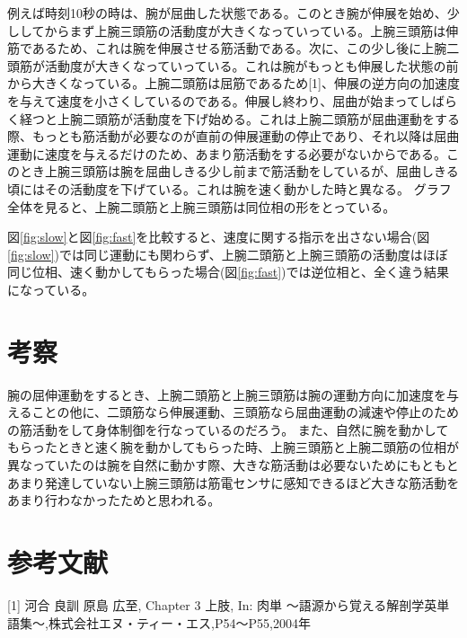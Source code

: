 \documentclass{jsarticle}
\begin{document}
例えば時刻10秒の時は、腕が屈曲した状態である。このとき腕が伸展を始め、少ししてからまず上腕三頭筋の活動度が大きくなっていっている。上腕三頭筋は伸筋であるため、これは腕を伸展させる筋活動である。次に、この少し後に上腕二頭筋が活動度が大きくなっていっている。これは腕がもっとも伸展した状態の前から大きくなっている。上腕二頭筋は屈筋であるため[1]、伸展の逆方向の加速度を与えて速度を小さくしているのである。伸展し終わり、屈曲が始まってしばらく経つと上腕二頭筋が活動度を下げ始める。これは上腕二頭筋が屈曲運動をする際、もっとも筋活動が必要なのが直前の伸展運動の停止であり、それ以降は屈曲運動に速度を与えるだけのため、あまり筋活動をする必要がないからである。このとき上腕三頭筋は腕を屈曲しきる少し前まで筋活動をしているが、屈曲しきる頃にはその活動度を下げている。これは腕を速く動かした時と異なる。
グラフ全体を見ると、上腕二頭筋と上腕三頭筋は同位相の形をとっている。

図\ref{fig:slow}と図\ref{fig:fast}を比較すると、速度に関する指示を出さない場合(図\ref{fig:slow})では同じ運動にも関わらず、上腕二頭筋と上腕三頭筋の活動度はほぼ同じ位相、速く動かしてもらった場合(図\ref{fig:fast})では逆位相と、全く違う結果になっている。

\section{考察}
腕の屈伸運動をするとき、上腕二頭筋と上腕三頭筋は腕の運動方向に加速度を与えることの他に、二頭筋なら伸展運動、三頭筋なら屈曲運動の減速や停止のための筋活動をして身体制御を行なっているのだろう。
また、自然に腕を動かしてもらったときと速く腕を動かしてもらった時、上腕三頭筋と上腕二頭筋の位相が異なっていたのは腕を自然に動かす際、大きな筋活動は必要ないためにもともとあまり発達していない上腕三頭筋は筋電センサに感知できるほど大きな筋活動をあまり行わなかったためと思われる。

\section*{参考文献}
[1] 河合 良訓 原島 広至, Chapter 3 上肢, In: 肉単 〜語源から覚える解剖学英単語集〜,株式会社エヌ・ティー・エス,P54〜P55,2004年
\end{document}
